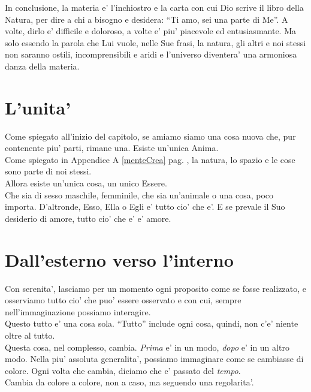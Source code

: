 In conclusione, la materia e' l'inchiostro e la carta con cui Dio scrive il libro della Natura, per dire a chi a bisogno e desidera: ``Ti amo, sei una parte di Me''. A volte, dirlo e' difficile e doloroso, a volte e' piu' piacevole ed entusiasmante. Ma solo essendo la parola che Lui vuole, nelle Sue frasi, la natura, gli altri e noi stessi non saranno ostili, incomprensibili e aridi e l'universo diventera' una armoniosa danza della materia.


\section{L'unita'}
Come spiegato all'inizio del capitolo, se amiamo siamo una cosa nuova che, pur contenente piu' parti, rimane una. Esiste un'unica Anima.\\
Come spiegato in Appendice A \ref{menteCrea} pag. \pageref{menteCrea}, la natura, lo spazio e le cose sono parte di noi stessi.\\
Allora esiste un'unica cosa, un unico Essere.\\

Che sia di sesso maschile, femminile, che sia un'animale o una cosa, poco importa. D'altronde, Esso, Ella o Egli e' tutto cio' che e'. E se prevale il Suo desiderio di amore, tutto cio' che e' e' amore.

\section{Dall'esterno verso l'interno}
\label{extInt}

Con serenita', lasciamo per un momento ogni proposito come se fosse realizzato, e osserviamo tutto cio' che puo' essere osservato e con cui, sempre nell'immaginazione possiamo interagire.\\
Questo tutto e' una cosa sola. ``Tutto'' include ogni cosa, quindi, non c'e' niente oltre al tutto.\\
Questa cosa, nel complesso, cambia. \emph{Prima} e' in un modo, \emph{dopo} e' in un altro modo. Nella piu' assoluta generalita', possiamo immaginare come se cambiasse di colore. Ogni volta che cambia, diciamo che e' passato del \emph{tempo}.\\
Cambia da colore a colore, non a caso, ma seguendo una regolarita'. \\

